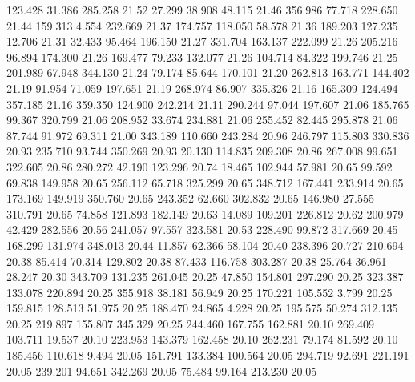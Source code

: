  123.428   31.386  285.258        21.52
  27.299   38.908   48.115        21.46
 356.986   77.718  228.650        21.44
 159.313    4.554  232.669        21.37
 174.757  118.050   58.578        21.36
 189.203  127.235   12.706        21.31
  32.433   95.464  196.150        21.27
 331.704  163.137  222.099        21.26
 205.216   96.894  174.300        21.26
 169.477   79.233  132.077        21.26
 104.714   84.322  199.746        21.25
 201.989   67.948  344.130        21.24
  79.174   85.644  170.101        21.20
 262.813  163.771  144.402        21.19
  91.954   71.059  197.651        21.19
 268.974   86.907  335.326        21.16
 165.309  124.494  357.185        21.16
 359.350  124.900  242.214        21.11
 290.244   97.044  197.607        21.06
 185.765   99.367  320.799        21.06
 208.952   33.674  234.881        21.06
 255.452   82.445  295.878        21.06
  87.744   91.972   69.311        21.00
 343.189  110.660  243.284        20.96
 246.797  115.803  330.836        20.93
 235.710   93.744  350.269        20.93
  20.130  114.835  209.308        20.86
 267.008   99.651  322.605        20.86
 280.272   42.190  123.296        20.74
  18.465  102.944   57.981        20.65
  99.592   69.838  149.958        20.65
 256.112   65.718  325.299        20.65
 348.712  167.441  233.914        20.65
 173.169  149.919  350.760        20.65
 243.352   62.660  302.832        20.65
 146.980   27.555  310.791        20.65
  74.858  121.893  182.149        20.63
  14.089  109.201  226.812        20.62
 200.979   42.429  282.556        20.56
 241.057   97.557  323.581        20.53
 228.490   99.872  317.669        20.45
 168.299  131.974  348.013        20.44
  11.857   62.366   58.104        20.40
 238.396   20.727  210.694        20.38
  85.414   70.314  129.802        20.38
  87.433  116.758  303.287        20.38
  25.764   36.961   28.247        20.30
 343.709  131.235  261.045        20.25
  47.850  154.801  297.290        20.25
 323.387  133.078  220.894        20.25
 355.918   38.181   56.949        20.25
 170.221  105.552    3.799        20.25
 159.815  128.513   51.975        20.25
 188.470   24.865    4.228        20.25
 195.575   50.274  312.135        20.25
 219.897  155.807  345.329        20.25
 244.460  167.755  162.881        20.10
 269.409  103.711   19.537        20.10
 223.953  143.379  162.458        20.10
 262.231   79.174   81.592        20.10
 185.456  110.618    9.494        20.05
 151.791  133.384  100.564        20.05
 294.719   92.691  221.191        20.05
 239.201   94.651  342.269        20.05
  75.484   99.164  213.230        20.05
